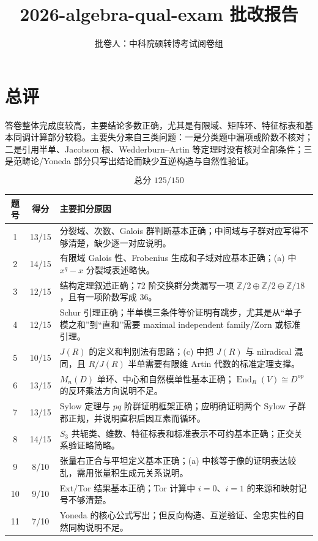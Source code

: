 \documentclass[11pt]{article}
\title{\textbf{2026-algebra-qual-exam 批改报告}}
\author{批卷人：中科院硕转博考试阅卷组}
\date{}
\begin{document}
\maketitle

\section*{总评}

答卷整体完成度较高，主要结论多数正确，尤其是有限域、矩阵环、特征标表和基本同调计算部分较稳。主要失分来自三类问题：一是分类题中漏项或阶数不核对；二是引用半单、Jacobson 根、Wedderburn--Artin 等定理时没有核对全部条件；三是范畴论/Yoneda 部分只写出结论而缺少互逆构造与自然性验证。

\[
  \boxed{\text{总分 }125/150}
\]

\begin{center}
\begin{tabular}{c|c|L{8.5cm}}
\toprule
题号 & 得分 & 主要扣分原因\\
 & 13/15 & 分裂域、次数、Galois 群判断基本正确；中间域与子群对应写得不够清楚，缺少逐一对应说明。\\
2 & 14/15 & 有限域 Galois 性、Frobenius 生成和子域对应基本正确；(a) 中 \(x^q-x\) 分裂域表述略快。\\
3 & 12/15 & 结构定理叙述正确；72 阶交换群分类漏写一项 \(\mathbb Z/2\oplus\mathbb Z/2\oplus\mathbb Z/18\)，且有一项阶数写成 36。\\
4 & 12/15 & Schur 引理正确；半单模三条件等价证明有跳步，尤其是从“单子模之和”到“直和”需要 maximal independent family/Zorn 或标准引理。\\
5 & 10/15 & \(J(R)\) 的定义和判别法有思路；(c) 中把 \(J(R)\) 与 nilradical 混同，且 \(R/J(R)\) 半单需要有限维 Artin 代数的标准定理支撑。\\
6 & 13/15 & \(M_n(D)\) 单环、中心和自然模单性基本正确；\(\operatorname{End}_R(V)\cong D^{op}\) 的反环乘法方向说明不足。\\
7 & 13/15 & Sylow 定理与 \(pq\) 阶群证明框架正确；应明确证明两个 Sylow 子群都正规，并说明直积后因互素而循环。\\
8 & 14/15 & \(S_3\) 共轭类、维数、特征标表和标准表示不可约基本正确；正交关系验证略简略。\\
9 & 8/10 & 张量右正合与平坦定义基本正确；(a) 中核等于像的证明表达较乱，需用张量积生成元关系说明。\\
10 & 9/10 & Ext/Tor 结果基本正确；Tor 计算中 \(i=0\)、\(i=1\) 的来源和映射记号不够清楚。\\
11 & 7/10 & Yoneda 的核心公式写出；但反向构造、互逆验证、全忠实性的自然同构说明不足。\\
\bottomrule
\end{tabular}
\end{center}
\end{document}
